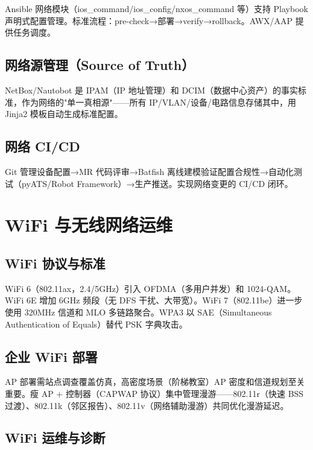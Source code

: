 \documentclass[12pt,UTF8]{ctexbook}
\begin{document}
Ansible 网络模块（ios\_command/ios\_config/nxos\_command 等）支持 Playbook 声明式配置管理。标准流程：pre-check→部署→verify→rollback。AWX/AAP 提供任务调度。

  \section{网络源管理（Source of Truth）}

NetBox/Nautobot 是 IPAM（IP 地址管理）和 DCIM（数据中心资产）的事实标准，作为网络的"单一真相源"——所有 IP/VLAN/设备/电路信息存储其中，用 Jinja2 模板自动生成标准配置。

  \section{网络 CI/CD}

Git 管理设备配置→MR 代码评审→Batfish 离线建模验证配置合规性→自动化测试（pyATS/Robot Framework）→生产推送。实现网络变更的 CI/CD 闭环。


\chapter{WiFi 与无线网络运维}
\label{chap:wifi-wireless}

  \section{WiFi 协议与标准}

WiFi 6（802.11ax，2.4/5GHz）引入 OFDMA（多用户并发）和 1024-QAM。WiFi 6E 增加 6GHz 频段（无 DFS 干扰、大带宽）。WiFi 7（802.11be）进一步使用 320MHz 信道和 MLO 多链路聚合。WPA3 以 SAE（Simultaneous Authentication of Equals）替代 PSK 字典攻击。

  \section{企业 WiFi 部署}

AP 部署需站点调查覆盖仿真，高密度场景（阶梯教室）AP 密度和信道规划至关重要。瘦 AP + 控制器（CAPWAP 协议）集中管理漫游——802.11r（快速 BSS 过渡）、802.11k（邻区报告）、802.11v（网络辅助漫游）共同优化漫游延迟。

  \section{WiFi 运维与诊断}
\end{document}
